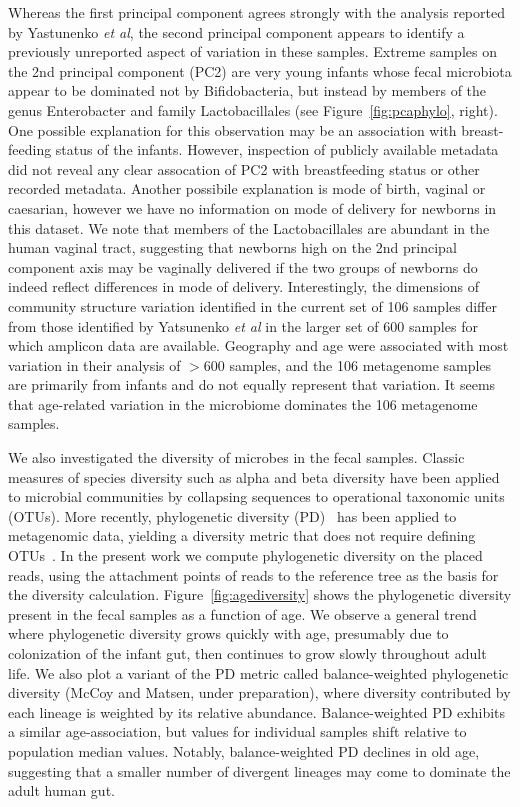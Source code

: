 \documentclass[10pt]{article}
\begin{document}
Whereas the first principal component agrees strongly with the analysis reported by Yastunenko \textit{et al}, the second principal component appears to identify a previously unreported aspect of variation in these samples.
Extreme samples on the 2nd principal component (PC2) are very young infants whose fecal microbiota appear to be dominated not by Bifidobacteria, but instead by members of the genus Enterobacter and family Lactobacillales (see Figure~\ref{fig:pcaphylo}, right).
One possible explanation for this observation may be an association with breast-feeding status of the infants.
However, inspection of publicly available metadata did not reveal any clear assocation of PC2 with breastfeeding status or other recorded metadata.
Another possibile explanation is mode of birth, vaginal or caesarian, however we have no information on mode of delivery for newborns in this dataset.
We note that members of the Lactobacillales are abundant in the human vaginal tract, suggesting that newborns high on the 2nd principal component axis may be vaginally delivered if the two groups of newborns do indeed reflect differences in mode of delivery.
Interestingly, the dimensions of community structure variation identified in the current set of 106 samples differ from those identified by Yatsunenko \textit{et al} in the larger set of 600 samples for which amplicon data are available.
Geography and age were associated with most variation in their analysis of $>$600 samples, and the 106 metagenome samples are primarily from infants and do not equally represent that variation.
It seems that age-related variation in the microbiome dominates the 106 metagenome samples.

We also investigated the diversity of microbes in the fecal samples.
Classic measures of species diversity such as alpha and beta diversity have been applied to microbial communities by collapsing sequences to operational taxonomic units (OTUs).
More recently, phylogenetic diversity (PD)~\cite{Faith1992} has been applied to metagenomic data, yielding a diversity metric that does not require defining OTUs~\cite{Kembel2011}.
In the present work we compute phylogenetic diversity on the placed reads, using the attachment points of reads to the reference tree as the basis for the diversity calculation.
Figure~\ref{fig:agediversity} shows the phylogenetic diversity present in the fecal samples as a function of age.
We observe a general trend where phylogenetic diversity grows quickly with age, presumably due to colonization of the infant gut, then continues to grow slowly throughout adult life.
We also plot a variant of the PD metric called balance-weighted phylogenetic diversity (McCoy and Matsen, under preparation), where diversity contributed by each lineage is weighted by its relative abundance.
Balance-weighted PD exhibits a similar age-association, but values for individual samples shift relative to population median values.
Notably, balance-weighted PD declines in old age, suggesting that a smaller number of divergent lineages may come to dominate the adult human gut.
\end{document}
